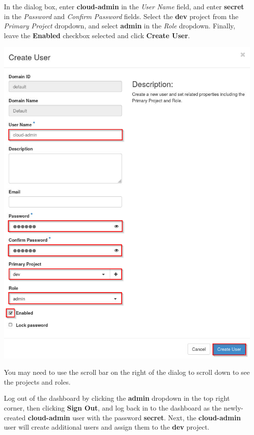 \documentclass[letterpaper, 12pt]{article}
\begin{document}
\begin{enumerate}
    \begin{labstep}
        In the dialog box, enter \textbf{cloud-admin} in the \textit{User Name} field, and enter \textbf{secret} in the \textit{Password} and \textit{Confirm Password} fields.
        Select the \textbf{dev} project from the \textit{Primary Project} dropdown, and select \textbf{admin} in the \textit{Role} dropdown.
        Finally, leave the \textbf{Enabled} checkbox selected and click \textbf{Create User}.

        \begin{center}
            \includegraphics[scale=0.7]{images/part3/step3.png}
        \end{center}
    \end{labstep}

    \begin{tipbox}
        You may need to use the scroll bar on the right of the dialog to scroll down to see the projects and roles.
    \end{tipbox}

    \begin{labstep}
        Log out of the dashboard by clicking the \textbf{admin} dropdown in the top right corner, then clicking \textbf{Sign Out}, and log back in to the dashboard as the newly-created \textbf{cloud-admin} user with the password \textbf{secret}.
        Next, the \textbf{cloud-admin} user will create additional users and assign them to the \textbf{dev} project.


\end{labstep}
\end{enumerate}
\end{document}
